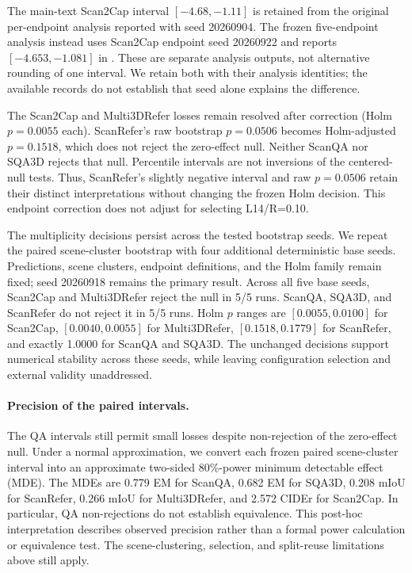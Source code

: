 The main-text Scan2Cap interval $[-4.68,-1.11]$ is retained from the original per-endpoint analysis reported with seed 20260904. The frozen five-endpoint analysis instead uses Scan2Cap endpoint seed 20260922 and reports $[-4.653,-1.081]$ in . These are separate analysis outputs, not alternative rounding of one interval. We retain both with their analysis identities; the available records do not establish that seed alone explains the difference.

The Scan2Cap and Multi3DRefer losses remain resolved after correction (Holm $p=0.0055$ each). ScanRefer's raw bootstrap $p=0.0506$ becomes Holm-adjusted $p=0.1518$, which does not reject the zero-effect null. Neither ScanQA nor SQA3D rejects that null. Percentile intervals are not inversions of the centered-null tests. Thus, ScanRefer's slightly negative interval and raw $p=0.0506$ retain their distinct interpretations without changing the frozen Holm decision. This endpoint correction does not adjust for selecting L14/R=0.10.

The multiplicity decisions persist across the tested bootstrap seeds. We repeat the paired scene-cluster bootstrap with four additional deterministic base seeds. Predictions, scene clusters, endpoint definitions, and the Holm family remain fixed; seed 20260918 remains the primary result. Across all five base seeds, Scan2Cap and Multi3DRefer reject the null in 5/5 runs. ScanQA, SQA3D, and ScanRefer do not reject it in 5/5 runs. Holm $p$ ranges are $[0.0055,0.0100]$ for Scan2Cap, $[0.0040,0.0055]$ for Multi3DRefer, $[0.1518,0.1779]$ for ScanRefer, and exactly 1.0000 for ScanQA and SQA3D. The unchanged decisions support numerical stability across these seeds, while leaving configuration selection and external validity unaddressed.

\paragraph{Precision of the paired intervals.} The QA intervals still permit small losses despite non-rejection of the zero-effect null. Under a normal approximation, we convert each frozen paired scene-cluster interval into an approximate two-sided 80\%-power minimum detectable effect (MDE). The MDEs are 0.779 EM for ScanQA, 0.682 EM for SQA3D, 0.208 mIoU for ScanRefer, 0.266 mIoU for Multi3DRefer, and 2.572 CIDEr for Scan2Cap. In particular, QA non-rejections do not establish equivalence. This post-hoc interpretation describes observed precision rather than a formal power calculation or equivalence test. The scene-clustering, selection, and split-reuse limitations above still apply.

